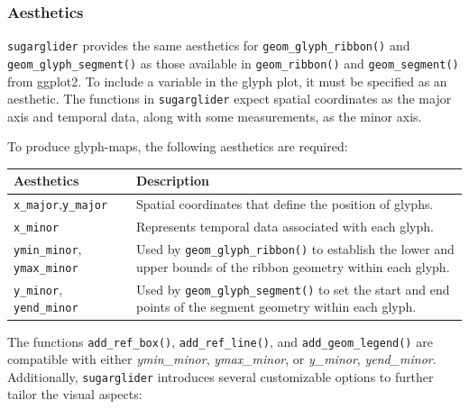 \subsubsection{Aesthetics}\label{aesthetics}

\texttt{sugarglider} provides the same aesthetics for \texttt{geom\_glyph\_ribbon()} and \texttt{geom\_glyph\_segment()} as those available in \texttt{geom\_ribbon()} and \texttt{geom\_segment()} from ggplot2. To include a variable in the glyph plot, it must be specified as an aesthetic. The functions in \texttt{sugarglider} expect spatial coordinates as the major axis and temporal data, along with some measurements, as the minor axis.

To produce glyph-maps, the following aesthetics are required:

\begin{longtable}[]{@{}
  >{\raggedright\arraybackslash}p{}
  >{\raggedright\arraybackslash}p{}@{}}
\toprule\noalign{}
\begin{minipage}[b]{\linewidth}\raggedright
Aesthetics
\end{minipage} & \begin{minipage}[b]{\linewidth}\raggedright
Description
\end{minipage} \\
\midrule\noalign{}
\endhead
\bottomrule\noalign{}
\endlastfoot
\texttt{x\_major},\texttt{y\_major} & Spatial coordinates that define the position of glyphs. \\
\texttt{x\_minor} & Represents temporal data associated with each glyph. \\
\texttt{ymin\_minor}, \texttt{ymax\_minor} & Used by \texttt{geom\_glyph\_ribbon()} to establish the lower and upper bounds of the ribbon geometry within each glyph. \\
\texttt{y\_minor}, \texttt{yend\_minor} & Used by \texttt{geom\_glyph\_segment()} to set the start and end points of the segment geometry within each glyph. \\
\end{longtable}

The functions \texttt{add\_ref\_box()}, \texttt{add\_ref\_line()}, and \texttt{add\_geom\_legend()} are compatible with either \emph{ymin\_minor}, \emph{ymax\_minor}, or \emph{y\_minor}, \emph{yend\_minor}. Additionally, \texttt{sugarglider} introduces several customizable options to further tailor the visual aspects:

